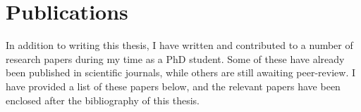 \chapter*{Publications}
\noindent
In addition to writing this thesis, I have written and contributed to a number of research papers during my time as a PhD student.
Some of these have already been published in scientific journals, while others are still awaiting peer-review.
I have provided a list of these papers below, and the relevant papers have been enclosed after the bibliography of this thesis.

\printpapers

